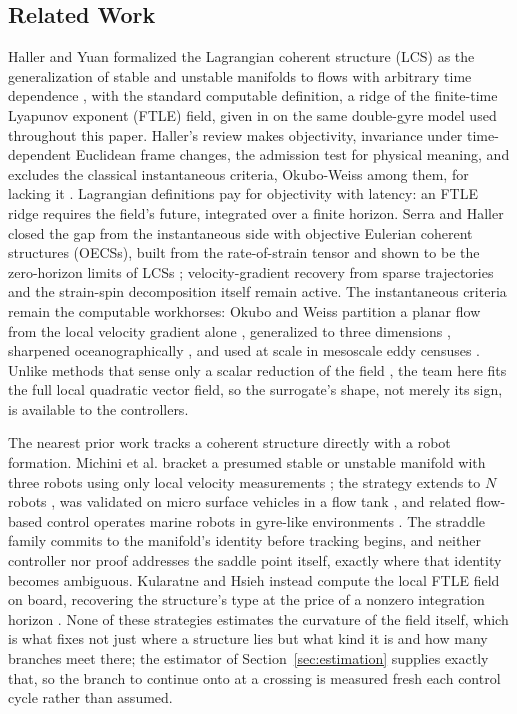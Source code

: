 \documentclass[lettersize,journal]{IEEEtran}
\begin{document}

\subsection{Related Work}
\label{sec:related_robots}

Haller and Yuan formalized the Lagrangian coherent structure (LCS) as
the generalization of stable and unstable manifolds to flows with
arbitrary time dependence \cite{6}, with the standard computable
definition, a ridge of the finite-time Lyapunov exponent (FTLE) field,
given in \cite{8} on the same double-gyre model used throughout this
paper. Haller's review makes objectivity, invariance under
time-dependent Euclidean frame changes, the admission test for physical
meaning, and excludes the classical instantaneous criteria, Okubo-Weiss
among them, for lacking it \cite{16}. Lagrangian definitions pay for
objectivity with latency: an FTLE ridge requires the field's future,
integrated over a finite horizon. Serra and Haller closed the gap from
the instantaneous side with objective Eulerian coherent structures
(OECSs), built from the rate-of-strain tensor and shown to be the
zero-horizon limits of LCSs \cite{17,18}; velocity-gradient recovery
from sparse trajectories \cite{19} and the strain-spin decomposition
itself \cite{20} remain active. The instantaneous criteria remain the
computable workhorses: Okubo and Weiss partition a planar flow from the
local velocity gradient alone \cite{21,22}, generalized to three
dimensions \cite{23}, sharpened oceanographically \cite{24}, and used
at scale in mesoscale eddy censuses \cite{5}. Unlike methods that sense
only a scalar reduction of the field \cite{25}, the team here fits the
full local quadratic vector field, so the surrogate's shape, not merely
its sign, is available to the controllers.

The nearest prior work tracks a coherent structure directly with a
robot formation. Michini et al. bracket a presumed stable or unstable
manifold with three robots using only local velocity measurements
\cite{9}; the strategy extends to $N$ robots \cite{10}, was validated
on micro surface vehicles in a flow tank \cite{11}, and related
flow-based control operates marine robots in gyre-like environments
\cite{12}. The straddle family commits to the manifold's identity
before tracking begins, and neither controller nor proof addresses the
saddle point itself, exactly where that identity becomes ambiguous.
Kularatne and Hsieh instead compute the local FTLE field on board,
recovering the structure's type at the price of a nonzero integration
horizon \cite{13}. None of these strategies estimates the curvature of
the field itself, which is what fixes not just where a structure lies
but what kind it is and how many branches meet there; the estimator of
Section~\ref{sec:estimation} supplies exactly that, so the branch to
continue onto at a crossing is measured fresh each control cycle rather
than assumed.
\end{document}

